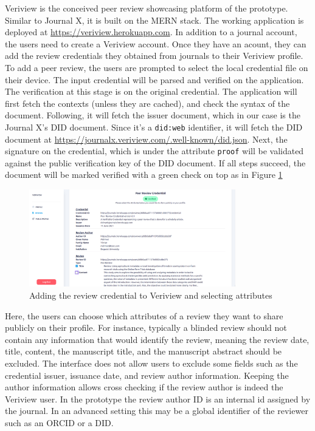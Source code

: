 Veriview is the conceived peer review showcasing platform of the prototype. Similar to Journal X, it is built on the \acrshort{MERN} stack. The working application is deployed at \url{https://veriview.herokuapp.com}. In addition to a journal account, the users need to create a Veriview account. Once they have an acount, they can add the review credentials they obtained from journals to their Veriview profile. To add a peer review, the users are prompted to select the local credential file on their device. The input credential will be parsed and verified on the application. The verification at this stage is on the original credential. The application will first fetch the contexts (unless they are cached), and check the syntax of the document. Following, it will fetch the issuer document, which in our case is the Journal X's \acrshort{DID} document. Since it's a \lstinline{did:web} identifier, it will fetch the \acrshort{DID} document at \url{https://journalx.veriview.com/.well-known/did.json}. Next, the signature on the credential, which is under the attribute \lstinline{proof} will be validated against the public verification key of the \acrshort{DID} document. If all steps succeed, the document will be marked verified with a green check on top as in Figure \ref{fig:select-attributes}

\begin{figure}[htpb]
  \centering
  \includegraphics[width=0.8\textwidth]{figures/select-attributes.png}
  \caption{Adding the review credential to Veriview and selecting attributes} \label{fig:select-attributes}
\end{figure}

Here, the users can choose which attributes of a review they want to share publicly on their profile. For instance, typically a blinded review should not contain any information that would identify the review, meaning the review date, title, content, the manuscript title, and the manuscript abstract should be excluded. The interface does not allow users to exclude some fields such as the credential issuer, issuance date, and review author information. Keeping the author information allows cross checking if the review author is indeed the Veriview user. In the prototype the review author ID is an internal id assigned by the journal. In an advanced setting this may be a global identifier of the reviewer such as an \acrshort{ORCID} or a \acrshort{DID}.

